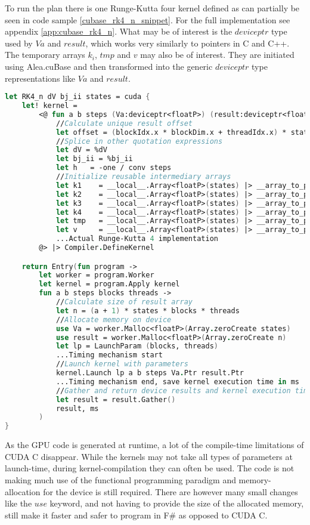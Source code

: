 To run the plan there is one Runge-Kutta four kernel defined as can partially be seen in code sample \ref{cubase_rk4_n_snippet}. 
For the full implementation see appendix \ref{app:cubase_rk4_n}. 
What may be of interest is the $deviceptr$ type used by $Va$ and $result$, which works very similarly to pointers in C and C++.
The temporary arrays $k_i$, $tmp$ and $v$ may also be of interest. 
They are initiated using Alea.cuBase and then transformed into the generic $deviceptr$ type representations like $Va$ and $result$.
\begin{lstlisting}[language=FSharp, caption=The Runge-Kutta four solver expressed in F\# Alea.cuBase, label=cubase_rk4_n_snippet]
let RK4_n dV bj_ii states = cuda {
	let! kernel =
		<@ fun a b steps (Va:deviceptr<floatP>) (result:deviceptr<floatP>) ->
			//Calculate unique result offset
			let offset = (blockIdx.x * blockDim.x + threadIdx.x) * states * (a + 1)
            //Splice in other quotation expressions
			let dV = %dV
			let bj_ii = %bj_ii
			let h   = -one / conv steps
			//Initialize reusable intermediary arrays
			let k1	  = __local__.Array<floatP>(states) |> __array_to_ptr
			let k2	  = __local__.Array<floatP>(states) |> __array_to_ptr
			let k3	  = __local__.Array<floatP>(states) |> __array_to_ptr
			let k4	  = __local__.Array<floatP>(states) |> __array_to_ptr
			let tmp	  = __local__.Array<floatP>(states) |> __array_to_ptr
			let v	  = __local__.Array<floatP>(states) |> __array_to_ptr
            ...Actual Runge-Kutta 4 implementation
        @> |> Compiler.DefineKernel 

    return Entry(fun program ->
        let worker = program.Worker
        let kernel = program.Apply kernel
        fun a b steps blocks threads ->
            //Calculate size of result array
            let n = (a + 1) * states * blocks * threads
            //Allocate memory on device
            use Va = worker.Malloc<floatP>(Array.zeroCreate states)
            use result = worker.Malloc<floatP>(Array.zeroCreate n)
            let lp = LaunchParam (blocks, threads)
            ...Timing mechanism start
            //Launch kernel with parameters
            kernel.Launch lp a b steps Va.Ptr result.Ptr
            ...Timing mechanism end, save kernel execution time in ms
            //Gather and return device results and kernel execution time
            let result = result.Gather()
            result, ms
        )
}
\end{lstlisting}

As the GPU code is generated at runtime, a lot of the compile-time limitations of CUDA C disappear.
While the kernels may not take all types of parameters at launch-time, during kernel-compilation they can often be used.
The code is not making much use of the functional programming paradigm and memory-allocation for the device is still required.
There are however many small changes like the $use$ keyword, and not having to provide the size of the allocated memory, still make it faster and safer to program in F\# as opposed to CUDA C.

